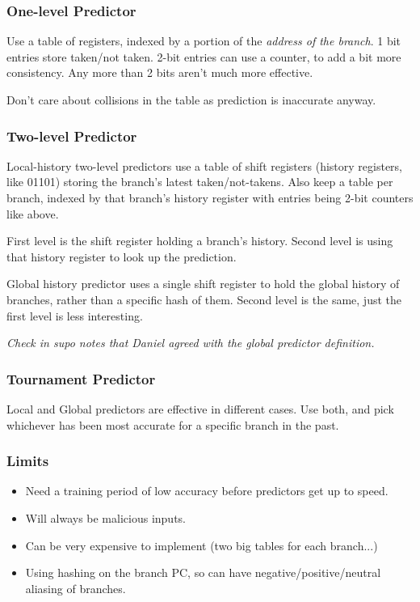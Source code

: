 \documentclass[11pt]{article}
\begin{document}
{{        \subsubsection*{One-level Predictor}
        {
            Use a table of registers, indexed by a portion of the \textit{address of the branch}. 1 bit entries store taken/not taken. 2-bit entries can use a counter, to add a bit more consistency. Any more than 2 bits aren't much more effective.

            Don't care about collisions in the table as prediction is inaccurate anyway.
        }
        \subsubsection*{Two-level Predictor}
        {
            Local-history two-level predictors use a table of shift registers (history registers, like 01101) storing the branch's latest taken/not-takens. Also keep a table per branch, indexed by that branch's history register with entries being 2-bit counters like above.

            First level is the shift register holding a branch's history. Second level is using that history register to look up the prediction.

            Global history predictor uses a single shift register to hold the global history of branches, rather than a specific hash of them. Second level is the same, just the first level is less interesting.

            \textit{Check in supo notes that Daniel agreed with the global predictor definition.}
        }
        \subsubsection*{Tournament Predictor}
        {
            Local and Global predictors are effective in different cases. Use both, and pick whichever has been most accurate for a specific branch in the past.
        }
        \subsubsection*{Limits}
        {
            \begin{itemize}
            \item Need a training period of low accuracy before predictors get up to speed.
            \item Will always be malicious inputs.
            \item Can be very expensive to implement (two big tables for each branch...)
            \item Using hashing on the branch PC, so can have negative/positive/neutral aliasing of branches.
            \end{itemize}
        }
}}
\end{document}
